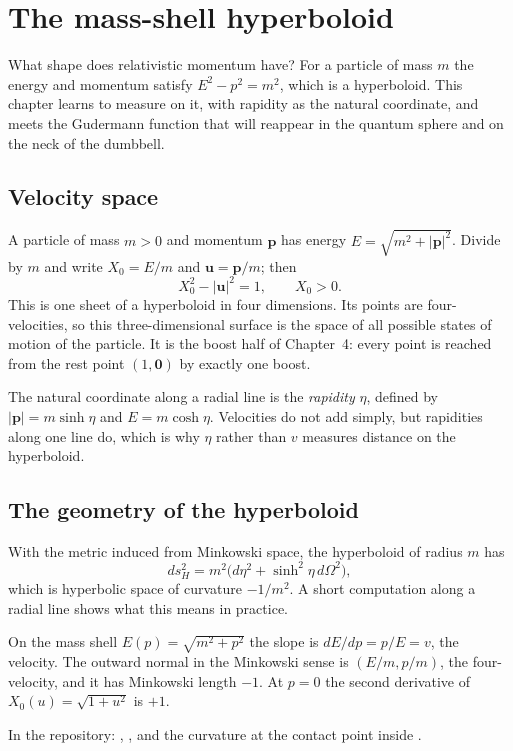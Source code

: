 \chapter{The mass-shell hyperboloid}\label{ch:massshell}

\begin{questionbox}
What shape does relativistic momentum have? For a particle of mass $m$ the energy and momentum satisfy $E^2-p^2=m^2$, which is a hyperboloid. This chapter learns to measure on it, with rapidity as the natural coordinate, and meets the Gudermann function that will reappear in the quantum sphere and on the neck of the dumbbell.
\end{questionbox}

\section{Velocity space}

A particle of mass $m>0$ and momentum $\mathbf p$ has energy $E=\sqrt{m^2+|\mathbf p|^2}$. Divide by $m$ and write $X_0=E/m$ and $\mathbf u=\mathbf p/m$; then
\[
X_0^2-|\mathbf u|^2=1,\qquad X_0>0 .
\]
This is one sheet of a hyperboloid in four dimensions. Its points are four-velocities, so this three-dimensional surface is the space of all possible states of motion of the particle. It is the boost half of Chapter~4: every point is reached from the rest point $(1,\mathbf 0)$ by exactly one boost.

The natural coordinate along a radial line is the \emph{rapidity} $\eta$, defined by $|\mathbf p|=m\sinh\eta$ and $E=m\cosh\eta$. Velocities do not add simply, but rapidities along one line do, which is why $\eta$ rather than $v$ measures distance on the hyperboloid.

\section{The geometry of the hyperboloid}

With the metric induced from Minkowski space, the hyperboloid of radius $m$ has
\[
ds_H^2=m^2\bigl(d\eta^2+\sinh^2\eta\,d\Omega^2\bigr),
\]
which is hyperbolic space of curvature $-1/m^2$. A short computation along a radial line shows what this means in practice.

\begin{proposition}\proved
On the mass shell $E(p)=\sqrt{m^2+p^2}$ the slope is $dE/dp=p/E=v$, the velocity. The outward normal in the Minkowski sense is $(E/m,p/m)$, the four-velocity, and it has Minkowski length $-1$. At $p=0$ the second derivative of $X_0(u)=\sqrt{1+u^2}$ is $+1$.
\end{proposition}
\noindent In the repository: , , and the curvature at the contact point inside .

